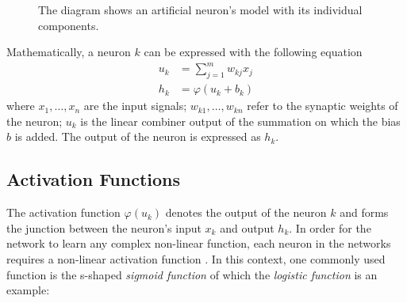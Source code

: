 \begin{figure}[h]
  \centering
  \caption{The diagram shows an artificial neuron's model with its individual components.}\label{fig:neuron}
\end{figure}

Mathematically, a neuron $k$ can be expressed with the following equation \cite{Haykin:1998:NNC:521706}
\begin{eqnarray} \label{eqn:neuron1}
  u_k &= \sum_{j = 1}^{m}w_{kj}x_{j} \\
  h_k &= \varphi(u_k + b_k)
\end{eqnarray}
where $x_1, \dots, x_n$ are the input signals; $w_{k1}, \dots, w_{kn}$ refer to the synaptic weights of the neuron; $u_k$ is the linear combiner output of the summation on which the bias $b$ is added. The output of the neuron is expressed as $h_k$.

\subsection{Activation Functions}
The activation function $\varphi(u_k)$ denotes the output of the neuron $k$ and forms the junction between the neuron's input $x_k$ and output $h_k$. In order for the network to learn any complex non-linear function, each neuron in the networks requires a non-linear activation function \cite{Goodfellow-et-al-2016}. In this context, one commonly used function is the s-shaped \textit{sigmoid function} of which the \textit{logistic function} \cite{Haykin:1998:NNC:521706} is an example:\\

